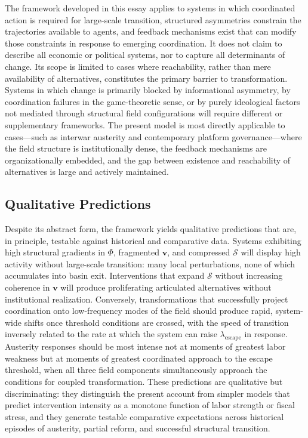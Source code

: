 \documentclass[11pt, a4paper]{article}
\begin{document}
The framework developed in this essay applies to systems in which coordinated action is required for large-scale transition, structured asymmetries constrain the trajectories available to agents, and feedback mechanisms exist that can modify those constraints in response to emerging coordination. It does not claim to describe all economic or political systems, nor to capture all determinants of change. Its scope is limited to cases where reachability, rather than mere availability of alternatives, constitutes the primary barrier to transformation. Systems in which change is primarily blocked by informational asymmetry, by coordination failures in the game-theoretic sense, or by purely ideological factors not mediated through structural field configurations will require different or supplementary frameworks. The present model is most directly applicable to cases---such as interwar austerity and contemporary platform governance---where the field structure is institutionally dense, the feedback mechanisms are organizationally embedded, and the gap between existence and reachability of alternatives is large and actively maintained.

\subsection{Qualitative Predictions}

Despite its abstract form, the framework yields qualitative predictions that are, in principle, testable against historical and comparative data. Systems exhibiting high structural gradients in $\Phi$, fragmented $\mathbf{v}$, and compressed $\mathcal{S}$ will display high activity without large-scale transition: many local perturbations, none of which accumulates into basin exit. Interventions that expand $\mathcal{S}$ without increasing coherence in $\mathbf{v}$ will produce proliferating articulated alternatives without institutional realization. Conversely, transformations that successfully project coordination onto low-frequency modes of the field should produce rapid, system-wide shifts once threshold conditions are crossed, with the speed of transition inversely related to the rate at which the system can raise $\lambda_{\mathrm{escape}}$ in response. Austerity responses should be most intense not at moments of greatest labor weakness but at moments of greatest coordinated approach to the escape threshold, when all three field components simultaneously approach the conditions for coupled transformation. These predictions are qualitative but discriminating: they distinguish the present account from simpler models that predict intervention intensity as a monotone function of labor strength or fiscal stress, and they generate testable comparative expectations across historical episodes of austerity, partial reform, and successful structural transition.
\end{document}
